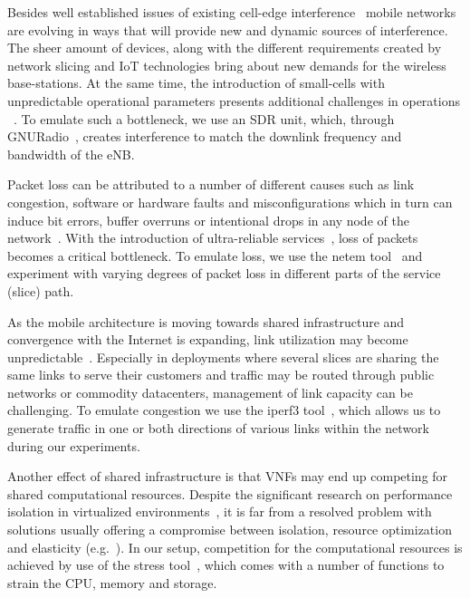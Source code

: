 \documentclass[journal,comsoc]{IEEEtran}
\begin{document}
% 
\begin{description}[style=unboxed,leftmargin=0cm]
\item[Interference.] Besides well established issues of existing cell-edge interference~\cite{boudreau2009interference} mobile networks are evolving in ways that will provide new and dynamic sources of interference. 
The sheer amount of devices, along with the different requirements created by network slicing and IoT technologies bring about new demands for the wireless base-stations. At the same time, the introduction of small-cells with unpredictable operational parameters presents additional challenges in operations ~\cite{lopez2011enhanced}.
To emulate such a bottleneck, we use an SDR unit, which, through GNURadio~\cite{gnuradio}, creates interference to match the downlink frequency and bandwidth of the eNB. 


\item[Packet Loss.] Packet loss can be attributed to a number of different causes such as link congestion, software or hardware faults and misconfigurations which in turn can induce bit errors, buffer overruns or intentional drops in any node of the network~\cite{netpilot}. 
With the introduction of ultra-reliable services~\cite{5gppp}, loss of packets becomes a critical bottleneck.
To emulate loss, we use the netem tool~\cite{netem} and experiment with varying degrees of packet loss in different parts of the service (slice) path.

\item[Link Congestion.] As the mobile architecture is moving towards shared infrastructure and convergence with the Internet is expanding, link utilization may become unpredictable~\cite{akyildiz2015softair}. 
Especially in deployments where several slices are sharing the same links to serve their customers and traffic may be routed through public networks or commodity datacenters, management of link capacity can be challenging.
To emulate congestion we use the iperf3 tool~\cite{iperf3}, which allows us to generate traffic in one or both directions of various links within the network during our experiments.

\item[Computational Resources.] Another effect of shared infrastructure is that VNFs may end up competing for shared computational resources. 
Despite the significant research on performance isolation in virtualized environments~\cite{bachiega2018container}, it is far from a resolved problem with solutions usually offering a compromise between isolation, resource optimization and elasticity (e.g.~\cite{zhao2017quantifying}).  
In our setup, competition for the computational resources is achieved by use of the stress tool~\cite{stress}, which comes with a number of functions to strain the CPU, memory and storage.


\end{description}
\end{document}
